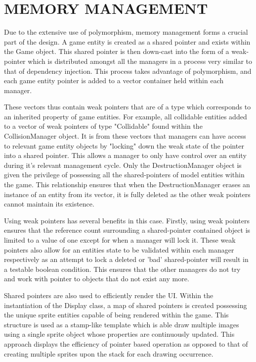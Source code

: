 \documentclass[10pt,twocolumn]{witseiepaper}
\begin{document}
%
\section{MEMORY MANAGEMENT}

Due to the extensive use of polymorphism, memory management forms a crucial part of the design. A game entity is created as a shared pointer and exists within the Game object. This shared pointer is then down-cast into the form of a weak-pointer which is distributed amongst all the managers in a process very similar to that of dependency injection. This process takes advantage of polymorphism, and each game entity pointer is added to a vector container held within each manager. 

These vectors thus contain weak pointers that are of a type which corresponds to an inherited property of game entities. For example, all collidable entities added to a vector of weak pointers of type "Collidable" found within the CollisionManager object. It is from these vectors that managers can have access to relevant game entity objects by "locking" down the weak state of the pointer into a shared pointer. This allows a manager to only have control over an entity during it's relevant management cycle. Only the DestructionManager object is given the privilege of possessing all the shared-pointers of model entities within the game. This relationship ensures that when the DestructionManager erases an instance of an entity from its vector, it is fully deleted as the other weak pointers cannot maintain its existence.

Using weak pointers has several benefits in this case. Firstly, using weak pointers ensures that the reference count surrounding a shared-pointer contained object is limited to a value of one except for when a manager will lock it. These weak pointers also allow for an entities state to be validated within each manager respectively as an attempt to lock a deleted or 'bad' shared-pointer will result in a testable boolean condition. This ensures that the other managers do not try and work with pointer to objects that do not exist any more.

Shared pointers are also used to efficiently render the UI. Within the instantiation of the Display class, a map of shared pointers is created possessing the unique sprite entities capable of being rendered within the game. This structure is used as a stamp-like template which is able draw multiple images using a single sprite object whose properties are continuously updated. This approach displays the efficiency of pointer based operation as opposed to that of creating multiple sprites upon the stack for each drawing occurrence.
\end{document}
